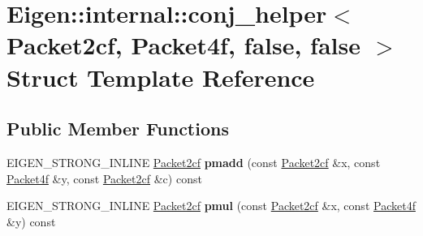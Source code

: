 \hypertarget{struct_eigen_1_1internal_1_1conj__helper_3_01_packet2cf_00_01_packet4f_00_01false_00_01false_01_4}{}\section{Eigen\+:\+:internal\+:\+:conj\+\_\+helper$<$ Packet2cf, Packet4f, false, false $>$ Struct Template Reference}
\label{struct_eigen_1_1internal_1_1conj__helper_3_01_packet2cf_00_01_packet4f_00_01false_00_01false_01_4}
\subsection*{Public Member Functions}
\begin{DoxyCompactItemize}
\item 
\mbox{\label{struct_eigen_1_1internal_1_1conj__helper_3_01_packet2cf_00_01_packet4f_00_01false_00_01false_01_4_af9cf403f4c7835908d5da81d8437a82d}} 
E\+I\+G\+E\+N\+\_\+\+S\+T\+R\+O\+N\+G\+\_\+\+I\+N\+L\+I\+NE \hyperlink{struct_eigen_1_1internal_1_1_packet2cf}{Packet2cf} {\bfseries pmadd} (const \hyperlink{struct_eigen_1_1internal_1_1_packet2cf}{Packet2cf} \&x, const \hyperlink{struct_eigen_1_1internal_1_1_packet4f}{Packet4f} \&y, const \hyperlink{struct_eigen_1_1internal_1_1_packet2cf}{Packet2cf} \&c) const
\item 
\mbox{\label{struct_eigen_1_1internal_1_1conj__helper_3_01_packet2cf_00_01_packet4f_00_01false_00_01false_01_4_ad5efd350158730484a9c4092b569359b}} 
E\+I\+G\+E\+N\+\_\+\+S\+T\+R\+O\+N\+G\+\_\+\+I\+N\+L\+I\+NE \hyperlink{struct_eigen_1_1internal_1_1_packet2cf}{Packet2cf} {\bfseries pmul} (const \hyperlink{struct_eigen_1_1internal_1_1_packet2cf}{Packet2cf} \&x, const \hyperlink{struct_eigen_1_1internal_1_1_packet4f}{Packet4f} \&y) const
\item 
\mbox{\label{struct_eigen_1_1internal_1_1conj__helper_3_01_packet2cf_00_01_packet4f_00_01false_00_01false_01_4_af9cf403f4c7835908d5da81d8437a82d}} 

\end{DoxyCompactItemize}
